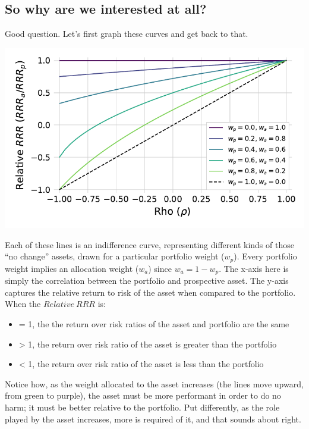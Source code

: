 \documentclass[]{article}
\providecommand{\tightlist}{%
  \setlength{\itemsep}{0pt}\setlength{\parskip}{0pt}}
\begin{document}
\hypertarget{so-why-are-we-interested-at-all}{%
\subsection{So why are we interested at
all?}\label{so-why-are-we-interested-at-all}}

Good question. Let's first graph these curves and get back to that.

\begin{center}\includegraphics{paper_files/figure-latex/Indifference curves-1} \end{center}

Each of these lines is an indifference curve, representing different
kinds of those ``no change'' assets, drawn for a particular portfolio
weight (\(w_p\)). Every portfolio weight implies an allocation weight
(\(w_a\)) since \(w_a = 1 - w_p\). The x-axis here is simply the
correlation between the portfolio and prospective asset. The y-axis
captures the relative return to risk of the asset when compared to the
portfolio. When the \(Relative\ RRR\) is:

\begin{itemize}
\tightlist
\item
  = 1, the the return over risk ratios of the asset and portfolio are
  the same
\item
  \textgreater{} 1, the return over risk ratio of the asset is greater
  than the portfolio
\item
  \textless{} 1, the return over risk ratio of the asset is less than
  the portfolio
\end{itemize}

Notice how, as the weight allocated to the asset increases (the lines
move upward, from green to purple), the asset must be more performant in
order to do no harm; it must be better relative to the portfolio. Put
differently, as the role played by the asset increases, more is required
of it, and that sounds about right.
\end{document}
